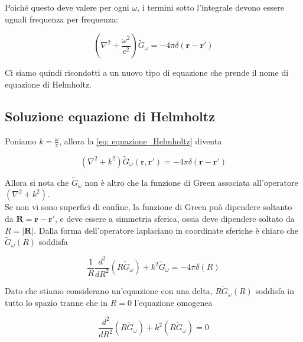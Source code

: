 Poiché questo deve valere per ogni $\omega$, i termini sotto l'integrale devono essere uguali frequenza per frequenza:

\begin{tcolorbox}[colback=yellow!10!white, colframe=orange!70!black, boxrule=0.8pt]
\begin{equation}\label{eq: equazione_Helmholtz}
    \left( \nabla^2 + \frac{\omega^2}{c^2} \right) \tilde{G}_{\omega} = - 4\pi \delta(\mathbf{r} - \mathbf{r'})
\end{equation}
\end{tcolorbox}

Ci siamo quindi ricondotti a un nuovo tipo di equazione che prende il nome di equazione di Helmholtz. 

\subsection{Soluzione equazione di Helmholtz}

Poniamo $k = \frac{\omega}{c}$, allora la \ref{eq: equazione_Helmholtz} diventa

\begin{equation}
    (\nabla^2 + k^2) \tilde{G}_{\omega} (\mathbf{r}, \mathbf{r'}) = -4\pi \delta(\mathbf{r} - \mathbf{r'})
\end{equation}

Allora si nota che $\tilde{G}_{\omega}$ non è altro che la funzione di Green associata all'operatore $(\nabla^2 + k^2)$.\\

Se non vi sono superfici di confine, la funzione di Green può dipendere soltanto da $\mathbf{R} = \mathbf{r} - \mathbf{r'}$, e deve essere a simmetria sferica, ossia deve dipendere soltato da $R = |\mathbf{R}|$. Dalla forma dell'operatore laplaciano in coordinate sferiche è chiaro che $\tilde{G}_{\omega}(R)$ soddisfa 

\begin{equation}
    \frac{1}{R}\frac{d^2}{dR^2} (R \tilde{G}_{\omega}) + k^2 \tilde{G}_{\omega} = -4 \pi\delta(R) 
\end{equation}

Dato che stiamo considerano un'equazione con una delta, $R \tilde{G}_{\omega}(R)$ soddisfa in tutto lo spazio tranne che in $R = 0$ l'equazione omogenea 

\begin{equation}
    \frac{d^2}{dR^2} (R \tilde{G}_{\omega}) + k^2 (R \tilde{G}_{\omega}) = 0
\end{equation}

